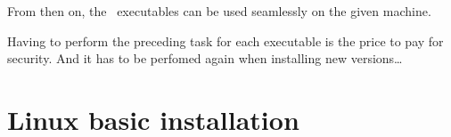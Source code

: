 From then on, the \mf\ executables can be used seamlessly on the given machine.

Having to perform the preceding task for each executable is the price to pay for security. And it has to be perfomed again when installing new versions\dots


%
%
%
%
%


\section{Linux basic installation}

